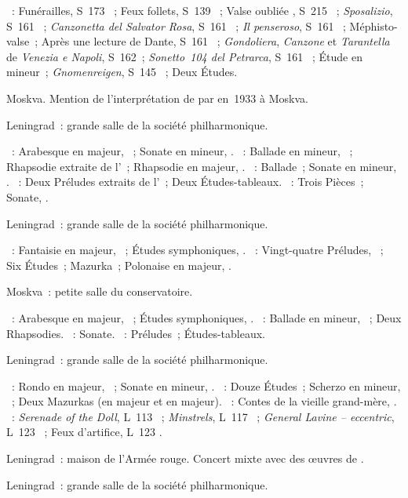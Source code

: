 \begin{description}
 \textsc{\Liszt{}}~: Funérailles, S~173 ~; Feux follets, S~139
 ~; Valse oubliée , S~215 ~;
 \emph{Sposalizio}, S~161 ~; \emph{Canzonetta del Salvator Rosa},
 S~161 ~; \emph{Il penseroso}, S~161 ~; Méphisto-valse~;
 Après une lecture de Dante, S~161 ~; \emph{Gondoliera},
 \emph{Canzone} et \emph{Tarantella} de \emph{Venezia e Napoli}, S~162~;
 \emph{Sonetto~104 del Petrarca}, S~161 ~; Étude en \kF mineur~;
 \emph{Gnomenreigen}, S~145 ~; Deux Études.
 \item[\DateWithWeekDay{1933-04-20}]
 Moskva.
 Mention de l'interprétation de  par
 \VSofronitsky{} en~1933 à Moskva.
 \item[\DateWithWeekDay{1933-04-25}]
 Leningrad~: grande salle de la société philharmonique.

 \textsc{\Schumann{}}~: Arabesque en \kC majeur, ~; Sonate en \kG
 mineur, .
 \textsc{\Brahms{}}~: Ballade en \kG mineur,  ~;
 Rhapsodie extraite de l'~; Rhapsodie en \kE \Flat majeur,
  .
 \textsc{\Chopin{}}~: Ballade~; Sonate en \kB \Flat mineur, .
 \textsc{\Rachmaninov{}}~: Deux Préludes extraits de l'~; Deux
 Études-tableaux.
 \textsc{\Scriabine{}}~: Trois Pièces~; Sonate, .
 \item[\DateWithWeekDay{1933-05-27}]
 Leningrad~: grande salle de la société philharmonique.

 \textsc{\Schumann{}}~: Fantaisie en \kC majeur, ~; Études
 symphoniques, .
 \textsc{\Chopin{}}~: Vingt-quatre Préludes, ~; Six Études~;
 Mazurka~; Polonaise en \kA \Flat majeur, .
 \item[\DateWithWeekDay{1933-06-04}]
 Moskva~: petite salle du conservatoire.

 \textsc{\Schumann{}}~: Arabesque en \kC majeur, ~; Études
 symphoniques, .
 \textsc{\Brahms{}}~: Ballade en \kG mineur,  ~; Deux
 Rhapsodies.
 \textsc{\Chopin{}}~: Sonate.
 \textsc{\Rachmaninov{}}~: Préludes~; Études-tableaux.
 \item[\DateWithWeekDay{1933-10-23}]
 Leningrad~: grande salle de la société philharmonique.

 \textsc{\Beethoven{}}~: Rondo en \kG majeur,  ~; Sonate
 en \kC mineur, .
 \textsc{\Chopin{}}~: Douze Études~; Scherzo en \kB \Flat mineur,
 ~; Deux Mazurkas (en \kC majeur et en \kB majeur).
 \textsc{\Prokofiev{}}~: Contes de la vieille grand-mère, .
 \textsc{\Debussy{}}~: \emph{Serenade of the Doll}, L~113 ~;
 \emph{Minstrels}, L~117 ~; \emph{General Lavine -- eccentric},
 L~123 ~; Feux d'artifice, L~123 .
 \item[\DateWithWeekDay{1933-11-09}]
 Leningrad~: maison de l'\hbox{Armée} rouge.
 Concert mixte avec des œuvres de \Chopin{}.
 \item[\DateWithWeekDay{1933-12-11}]
 Leningrad~: grande salle de la société philharmonique.


\end{description}
